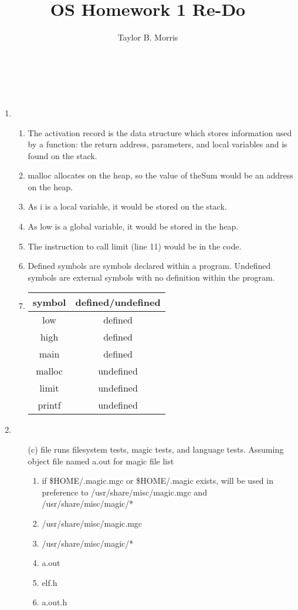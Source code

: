 \documentclass[12pt,letterpaper]{report}
\author{Taylor B. Morris}
\title{OS Homework 1 Re-Do}
\begin{document}
\makeatletter
{\huge\noindent\@title\large\\\@author\\\@date}
\makeatother
\begin{enumerate}
\item
\begin{enumerate}
\item The activation record is the data structure which stores information used by a function: the return address, parameters, and local variables and is found on the stack.
\item malloc allocates on the heap, so the value of theSum would be an address on the heap.
\item As i is a local variable, it would be stored on the stack.
\item As low is a global variable, it would be stored in the heap.
\item The instruction to call limit (line 11) would be in the code.
\item Defined symbols are symbols declared within a program. Undefined symbols are external symbols with no definition within the program.
\item \begin{tabular}{c|c}
\hline\hline
symbol & defined/undefined\\
\hline
low & defined\\
high & defined\\
main & defined\\
malloc & undefined\\
limit & undefined\\
printf & undefined\\
\hline\hline
\end{tabular}
\end{enumerate}
\item 
\begin{enumerate}
\item[(c)] file runs filesystem tests, magic tests, and language tests. Assuming object file named a.out for magic file list
\begin{enumerate}
\item if \$HOME/.magic.mgc or \$HOME/.magic exists, will be used in preference to /usr/share/misc/magic.mgc and /usr/share/misc/magic/*
\item /usr/share/misc/magic.mgc
\item /usr/share/misc/magic/*
\item a.out
\item elf.h
\item a.out.h

\end{enumerate}
\end{enumerate}
\end{enumerate}
\end{document}
